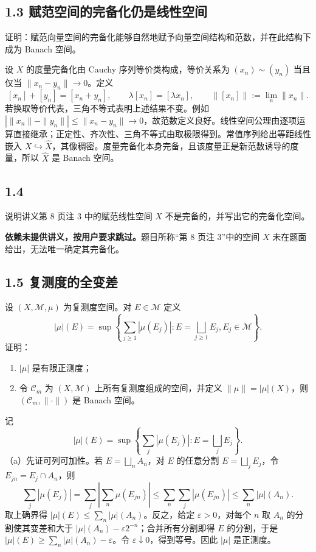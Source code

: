 \subsection*{1.3 赋范空间的完备化仍是线性空间}
\begin{problem}
证明：赋范向量空间的完备化能够自然地赋予向量空间结构和范数，并在此结构下成为 Banach 空间。
\end{problem}
设 $X$ 的度量完备化由 Cauchy 序列等价类构成，等价关系为 $(x_n)\sim(y_n)$ 当且仅当 $\|x_n-y_n\|\to0$。定义
\[
[x_n]+[y_n]=[x_n+y_n],\qquad \lambda[x_n]=[\lambda x_n],
\qquad \|[x_n]\|:=\lim_n\|x_n\|.
\]
若换取等价代表，三角不等式表明上述结果不变。例如
$|\|x_n\|-\|y_n\||\le\|x_n-y_n\|\to0$，故范数定义良好。线性空间公理由逐项运算直接继承；正定性、齐次性、三角不等式由取极限得到。常值序列给出等距线性嵌入 $X\hookrightarrow\widehat X$，其像稠密。度量完备化本身完备，且该度量正是新范数诱导的度量，所以 $\widehat X$ 是 Banach 空间。

\subsection*{1.4}
\begin{problem}
说明讲义第 8 页注 3 中的赋范线性空间 $X$ 不是完备的，并写出它的完备化空间。
\end{problem}
\textbf{依赖未提供讲义，按用户要求跳过。}题目所称“第 8 页注 3”中的空间 $X$ 未在题面给出，无法唯一确定其完备化。

\subsection*{1.5 复测度的全变差}
\begin{problem}
设 $(X,\mathcal M,\mu)$ 为复测度空间。对 $E\in\mathcal M$ 定义
\[
|\mu|(E)=\sup\left\{\sum_{j\ge1}|\mu(E_j)|:
E=\bigsqcup_{j\ge1}E_j, E_j\in\mathcal M\right\}.
\]
证明：
\begin{enumerate}[label=(\alph*)]
\item $|\mu|$ 是有限正测度；
\item 令 $\mathcal C_m$ 为 $(X,\mathcal M)$ 上所有复测度组成的空间，并定义
$\|\mu\|=|\mu|(X)$，则 $(\mathcal C_m,\|\cdot\|)$ 是 Banach 空间。
\end{enumerate}
\end{problem}
记
\[
|\mu|(E)=\sup\left\{\sum_j|\mu(E_j)|:E=\bigsqcup_jE_j\right\}.
\]
（a）先证可列可加性。若 $E=\bigsqcup_n A_n$，对 $E$ 的任意分割 $E=\bigsqcup_jE_j$，令 $E_{jn}=E_j\cap A_n$，则
\[
\sum_j|\mu(E_j)|=\sum_j\left|\sum_n\mu(E_{jn})\right|
\le\sum_n\sum_j|\mu(E_{jn})|\le\sum_n|\mu|(A_n).
\]
取上确界得 $|\mu|(E)\le\sum_n|\mu|(A_n)$。反之，给定 $\varepsilon>0$，对每个 $n$ 取 $A_n$ 的分割使其变差和大于 $|\mu|(A_n)-\varepsilon2^{-n}$；合并所有分割即得 $E$ 的分割，于是
$|\mu|(E)\ge\sum_n|\mu|(A_n)-\varepsilon$。令 $\varepsilon\downarrow0$，得到等号。因此 $|\mu|$ 是正测度。


